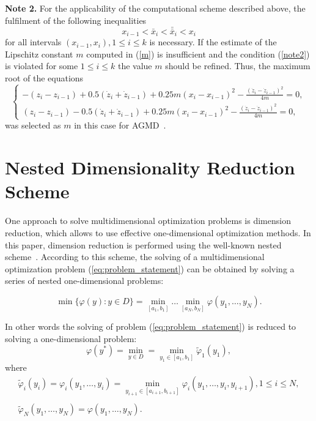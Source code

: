 \documentclass[runningheads]{llncs}
\begin{document}
\textbf{Note 2.} For the applicability of the computational scheme described above, the fulfilment of the following inequalities
\begin{equation}\label{note2}
x_{i-1} < \bar{x}_i < \bar{\bar{x}}_i < x_i
\end{equation}
for all intervals $(x_{i-1}, x_i), 1 \le i \le k$ is necessary. If the estimate of the Lipschitz constant $m$ computed in (\ref{m}) is insufficient and the condition (\ref{note2}) is violated for some $1 \le i \le k$ the value $m$ should be refined. Thus, the maximum root of the equations
\begin{equation}
\left\{
\begin{array}{ll}
-(z_i-z_{i-1})+0.5(\dot{z}_i+\dot{z}_{i-1})+0.25m(x_i-x_{i-1})^2-\frac{(\dot{z}_i-\dot{z}_{i-1})^2}{4m}=0, \\
(z_i-z_{i-1})-0.5(\dot{z}_i+\dot{z}_{i-1})+0.25m(x_i-x_{i-1})^2-\frac{(\dot{z}_i-\dot{z}_{i-1})^2}{4m}=0 ,
\end{array}
\right.
\end{equation}
was selected as $m$ in this case for AGMD~\cite{Gergel1996}.


\section{Nested Dimensionality Reduction Scheme}\label{sec:nestedreduction}

One approach to solve multidimensional optimization problems is dimension reduction, which allows to use effective one-dimensional optimization methods. In this paper, dimension reduction is performed using the well-known nested scheme~\cite{Dam2010,Shi2000,Strongin1978,Strongin2000,Strongin2013}. According to this scheme, the solving of a multidimensional optimization problem (\ref{eq:problem_statement}) can be obtained by solving a series of nested one-dimensional problems:

\begin{equation}
\min \{ \varphi(y) : y \in D\} = \min_{[a_1,b_1]} \ldots \min_{[a_N,b_N]} \varphi(y_1, \ldots, y_N).
\end{equation}

In other words the solving of problem (\ref{eq:problem_statement}) is reduced to solving a one-dimensional problem:
\begin{equation}\label{eq:nested}
\varphi(y^*) = \min_{y \in D} = \min_{y_1 \in [a_1,b_1]}\widetilde{\varphi}_1(y_1),
\end{equation}
where
\begin{equation}\label{eq:nested1}
\begin{array}{c}
\widetilde{\varphi}_i(y_i)=\varphi_i(y_1, \ldots, y_i) = \min\limits_{y_{i+1} \in [a_{i+1},b_{i+1}]}\varphi_i(y_1, \ldots, y_i,y_{i+1}), 1 \le i \le N, \\ \\
\widetilde{\varphi}_N(y_1, \ldots, y_N) = \varphi(y_1, \ldots, y_N).
\end{array}
\end{equation}
\end{document}
